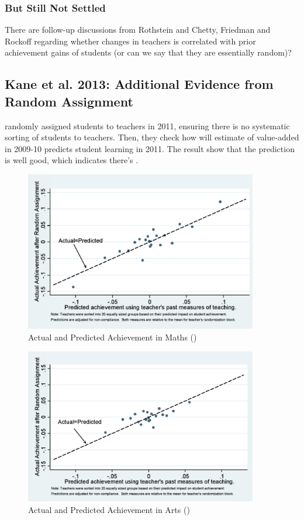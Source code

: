         \subsubsection{But Still Not Settled}
            There are follow-up discussions from Rothstein and Chetty, Friedman and Rockoff regarding whether changes in teachers is correlated with prior achievement gains of students (or can we say that they are essentially random)?
    
    \subsection{Kane et al. 2013: Additional Evidence from Random Assignment}

        \cite{kane_have_2013} randomly assigned students to teachers in 2011, ensuring there is no systematic sorting of students to teachers. Then, they check how will estimate of value-added in 2009-10 predicts student learning in 2011. The result show that the prediction is well good, which indicates there's .

        \begin{figure}[H]
            \centering
            \includegraphics[width=4in]{images/ch9/9 kane math.png}
            \caption{Actual and Predicted Achievement in Maths (\cite{kane_have_2013})}
        \end{figure}
        \begin{figure}[H]
            \centering
            \includegraphics[width=4in]{images/ch9/9 kane arts.png}
            \caption{Actual and Predicted Achievement in Arts (\cite{kane_have_2013})}
        \end{figure}
        
